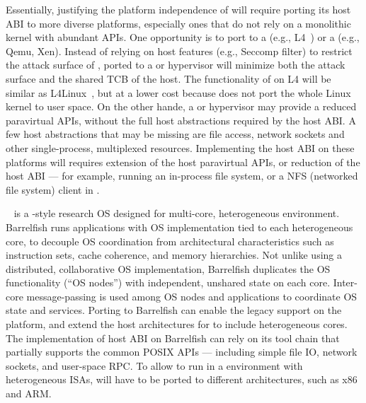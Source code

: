 Essentially,
justifying the platform independence of \graphene{} will
require porting its host ABI to more diverse platforms,
especially ones that do not rely on a monolithic kernel with abundant APIs.
One opportunity is to port \graphene{} to a \term{\microkernel{}}
(e.g., L4~\citep{l4family, klein09sel4}) or a  (e.g., Qemu, Xen).
Instead of relying on host features (e.g., Seccomp filter)
to restrict the attack surface of \picoprocs{},
\graphene{} ported to a \microkernel{} or hypervisor will minimize both the attack surface and the shared TCB of the host.
The functionality of \graphene{} on L4 will be similar as
L4Linux~\citep{hartig97mu},
but at a lower cost because \graphene{} does not port the whole Linux kernel to user space.
On the other hande,
a \microkernel{} or hypervisor
may provide a reduced paravirtual APIs,
without the full host abstractions required by the host ABI.
A few host abstractions that may be missing
are file access, network sockets and other single-process, multiplexed resources.
Implementing the host ABI on these platforms will requires
extension of the host paravirtual APIs, or reduction of the \graphene{} host ABI
--- for example, running an in-process file system, or a NFS (networked file system) client in \picoprocs{}.




~\citep{baumann09barrelfish, zellweger14barrelfishdc} is a \microkernel{}-style
research OS designed for multi-core, heterogeneous environment.
Barrelfish runs applications with OS implementation tied to each heterogeneous core,
to decouple OS coordination from
architectural characteristics such as instruction sets, cache coherence, and memory hierarchies.
Not unlike \graphene{} using a
distributed, collaborative OS implementation,
Barrelfish duplicates the OS functionality
(``OS nodes'')
with independent, unshared state on each core.
Inter-core message-passing is used among OS nodes and applications
to coordinate OS state and services.
Porting \graphene{} to Barrelfish can enable the legacy support on the platform,
and extend the host architectures for \graphene{}
to include heterogeneous cores.
The implementation of \graphene{} host ABI on Barrelfish
can rely on its tool chain that partially supports the common POSIX APIs
--- including simple file IO, network sockets,
and user-space RPC.
To allow \graphene{} to run in a environment with heterogeneous ISAs,
\graphene{} will have to be ported to different architectures,
such as x86 and ARM.


